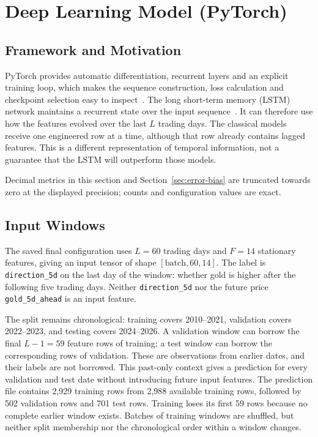 \section{Deep Learning Model (PyTorch)}
\label{sec:deep}

\subsection{Framework and Motivation}
PyTorch provides automatic differentiation, recurrent layers and an explicit training loop, which makes the sequence construction, loss calculation and checkpoint selection easy to inspect~\cite{b_paszke2019pytorch}. The long short-term memory (LSTM) network maintains a recurrent state over the input sequence~\cite{a_hochreiter1997}. It can therefore use how the features evolved over the last $L$ trading days. The classical models receive one engineered row at a time, although that row already contains lagged features. This is a different representation of temporal information, not a guarantee that the LSTM will outperform those models.

Decimal metrics in this section and Section~\ref{sec:error-bias} are truncated towards zero at the displayed precision; counts and configuration values are exact.

\subsection{Input Windows}
The saved final configuration uses $L=60$ trading days and $F=14$ stationary features, giving an input tensor of shape $[\mathrm{batch},60,14]$. The label is \texttt{direction\_5d} on the last day of the window: whether gold is higher after the following five trading days. Neither \texttt{direction\_5d} nor the future price \texttt{gold\_5d\_ahead} is an input feature.

The split remains chronological: training covers 2010--2021, validation covers 2022--2023, and testing covers 2024--2026. A validation window can borrow the final $L-1=59$ feature rows of training; a test window can borrow the corresponding rows of validation. These are observations from earlier dates, and their labels are not borrowed. This past-only context gives a prediction for every validation and test date without introducing future input features. The prediction file contains 2,929 training rows from 2,988 available training rows, followed by 502 validation rows and 701 test rows. Training loses its first 59 rows because no complete earlier window exists. Batches of training windows are shuffled, but neither split membership nor the chronological order within a window changes.

